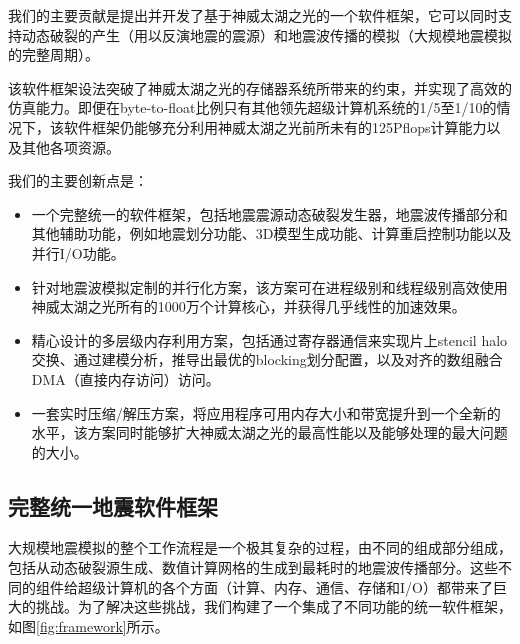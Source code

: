 \documentclass[degree=doctor]{thuthesis}
\begin{document}
我们的主要贡献是提出并开发了基于神威太湖之光的一个软件框架，它可以同时支持动态破裂的产生（用以反演地震的震源）和地震波传播的模拟（大规模地震模拟的完整周期）。

该软件框架设法突破了神威太湖之光的存储器系统所带来的约束，并实现了高效的仿真能力。即便在byte-to-float比例只有其他领先超级计算机系统的1/5至1/10的情况下，该软件框架仍能够充分利用神威太湖之光前所未有的125Pflops计算能力以及其他各项资源。

我们的主要创新点是：

\begin{itemize}
\item 一个完整统一的软件框架，包括地震震源动态破裂发生器，地震波传播部分和其他辅助功能，例如地震划分功能、3D模型生成功能、计算重启控制功能以及并行I/O功能。

\item 针对地震波模拟定制的并行化方案，该方案可在进程级别和线程级别高效使用神威太湖之光所有的1000万个计算核心，并获得几乎线性的加速效果。

\item 精心设计的多层级内存利用方案，包括通过寄存器通信来实现片上stencil halo交换、通过建模分析，推导出最优的blocking划分配置，以及对齐的数组融合DMA（直接内存访问）访问。

\item 一套实时压缩/解压方案，将应用程序可用内存大小和带宽提升到一个全新的水平，该方案同时能够扩大神威太湖之光的最高性能以及能够处理的最大问题的大小。
\end{itemize}

\subsection{完整统一地震软件框架}


大规模地震模拟的整个工作流程是一个极其复杂的过程，由不同的组成部分组成，包括从动态破裂源生成、数值计算网格的生成到最耗时的地震波传播部分。这些不同的组件给超级计算机的各个方面（计算、内存、通信、存储和I/O）都带来了巨大的挑战。为了解决这些挑战，我们构建了一个集成了不同功能的统一软件框架，如图\ref{fig:framework}所示。
\end{document}

